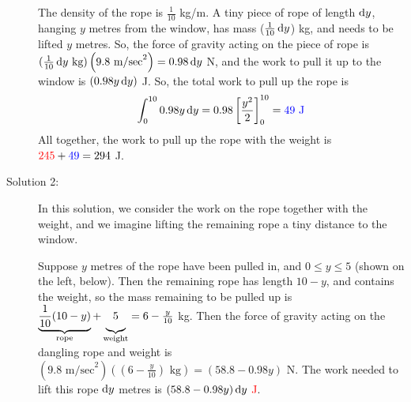 \begin{solution}
\begin{description}
The density of the rope is $\frac{1}{10}$ kg/m. A tiny piece of rope of length $\mathrm{d}y$, hanging $y$ metres from the window, has mass ($\frac{1}{10}\,\mathrm{d}y$) kg, and needs to be lifted $y$ metres. So, the force of gravity acting on the piece of rope is $(\frac{1}{10}\,\mathrm{d}y \text{ kg})\left(9.8\text{ m/sec}^2\right) = 0.98\,\mathrm{d}y$ N, and the work to pull it up to the window is $(0.98y\,\mathrm{d}y)$ J. So, the total work to pull up the rope is
\[\int_0^{10} 0.98y\,\mathrm{d}y = 0.98\left[\frac{y^2}{2}\right]_0^{10}=\textcolor{blue}{49\text{ J}}\]
All together, the work to pull up the rope with the weight is $\textcolor{red}{245}+\textcolor{blue}{49}=294$ J.

\item[Solution 2:] In this solution, we consider the work on the rope together with the weight, and we imagine lifting the remaining rope a tiny distance to the window.

Suppose $y$ metres of the rope have been pulled in, and $0 \le y \le 5$ (shown on the left, below). Then the remaining rope has length $10-y$, and contains the weight, so the mass remaining to be pulled up is $\underbrace{\frac{1}{10}(10-y)}_{\text{rope}} + \underbrace{\vphantom{\frac{1}{10}}5}_{\text{weight}} = 6-\frac{y}{10}$ kg. Then the force of gravity acting on the dangling rope and weight is $(9.8 \text{ m/sec}^2)((6-\frac{y}{10})\text{ kg}) =\left(58.8-0.98y\right)$ N. The work needed to lift this rope $\mathrm{d}y$ metres is \textcolor{red}{$\left(58.8-0.98y\right)\mathrm{d}y$ J}.

\begin{center}
\hspace{2cm}
\end{center}


\end{description}
\end{solution}
